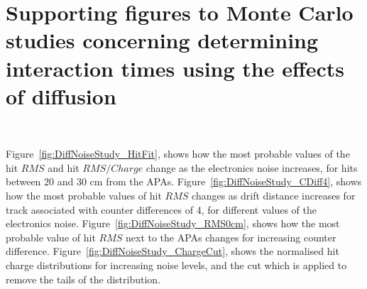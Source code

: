 \chapter{Supporting figures to Monte Carlo studies concerning determining interaction times using the effects of diffusion} ~\label{sec:DiffMCPlots}

\graphicspath{{Appendix1/Figs/PDF/}{Appendix1/Figs/Raster/}{Appendix1/Figs/Vector/}}

Figure~\ref{fig:DiffNoiseStudy_HitFit}, shows how the most probable values of the hit $RMS$ and hit $RMS/Charge$ change as the electronics noise increases, for hits between 20 and 30 cm from the APAs. Figure~\ref{fig:DiffNoiseStudy_CDiff4}, shows how the most probable values of hit $RMS$ changes as drift distance increases for track associated with counter differences of 4, for different values of the electronics noise. Figure~\ref{fig:DiffNoiseStudy_RMS0cm}, shows how the most probable value of hit $RMS$ next to the APAs changes for increasing counter difference. Figure~\ref{fig:DiffNoiseStudy_ChargeCut}, shows the normalised hit charge distributions for increasing noise levels, and the cut which is applied to remove the tails of the distribution. \\ 

